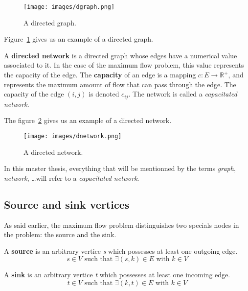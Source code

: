 \begin{figure}
\centering
\texttt{[image: images/dgraph.png]}
\caption{A directed graph.}
\label{img:dgraph}
\end{figure}

Figure~\ref{img:dgraph} gives us an example of a directed graph.

\begin{definition}
\label{dnetwork}
A \textbf{directed network} is a directed graph whose edges have a numerical value associated to it. In the case of the maximum flow problem, this value represents the capacity of the edge. The \textbf{capacity} of an edge is a mapping $c: E \to \mathbb{R}^{+}$, and represents the maximum amount of flow that can pass through the edge. The capacity of the edge $(i, j)$ is denoted $c_{ij}$. The network is called a \textit{capacitated network}.
\end{definition}

The figure~\ref{img:dnetwork} gives us an example of a directed network. \\

\begin{figure}
\centering
\texttt{[image: images/dnetwork.png]}
\caption{A directed network.}
\label{img:dnetwork}
\end{figure}



In this master thesis, everything that will be mentionned by the terms \textit{graph}, \textit{network}, \dots will refer to a \textit{capacitated network}.

\subsection{Source and sink vertices}
As said earlier, the maximum flow problem distinguishes two specials nodes in the problem: the source and the sink.

\begin{definition}
\label{source}
A \textbf{source} is an arbitrary vertice \textit{s} which possesses at least one outgoing edge.
$$s \in V \text{ such that } \exists (s, k) \in E \text{ with } k \in V$$
\end{definition}

\begin{definition}
\label{sink}
A \textbf{sink} is an arbitrary vertice \textit{t} which possesses at least one incoming edge. 
$$t \in V \text{ such that } \exists (k, t) \in E \text{ with } k \in V$$
\end{definition}

